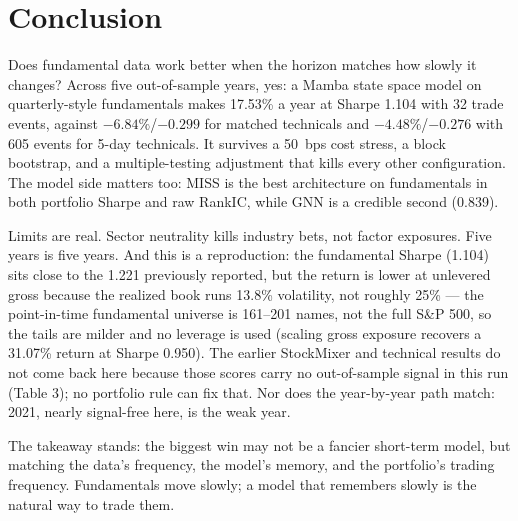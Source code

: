 \documentclass[11pt,twocolumn]{article}
\begin{document}
\section{Conclusion}

Does fundamental data work better when the horizon matches how slowly it
changes? Across five out-of-sample years, yes: a Mamba state space model
on quarterly-style fundamentals makes 17.53\% a year at Sharpe 1.104 with
32 trade events, against $-6.84\%$/$-0.299$ for matched technicals and
$-4.48\%$/$-0.276$ with 605 events for 5-day technicals. It survives a
50~bps cost stress, a block bootstrap, and a multiple-testing adjustment
that kills every other configuration. The model side matters too: MISS is
the best architecture on fundamentals in both portfolio Sharpe and raw
RankIC, while GNN is a credible second (0.839).

Limits are real. Sector neutrality kills industry bets, not factor
exposures. Five years is five years. And this is a reproduction: the
fundamental Sharpe (1.104) sits close to the 1.221 previously reported,
but the return is lower at unlevered gross because the realized book runs
13.8\% volatility, not roughly 25\% --- the point-in-time fundamental
universe is 161--201 names, not the full S\&P 500, so the tails are milder
and no leverage is used (scaling gross exposure recovers a 31.07\% return
at Sharpe 0.950). The earlier StockMixer and technical results do not
come back here because those scores carry no out-of-sample signal in this
run (Table 3); no portfolio rule can fix that. Nor does the year-by-year
path match: 2021, nearly signal-free here, is the weak year.

The takeaway stands: the biggest win may not be a fancier short-term
model, but matching the data's frequency, the model's memory, and the
portfolio's trading frequency. Fundamentals move slowly; a model that
remembers slowly is the natural way to trade them.
\end{document}
